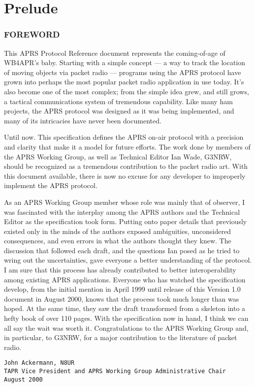 
\part{Prelude}

\section*{FOREWORD}

This APRS Protocol Reference document represents the coming-of-age of WB4APR’s baby.
Starting with a simple concept — a way to track the location of moving objects via packet radio
— programs using the APRS protocol have grown into perhaps the most popular packet radio
application in use today. It’s also become one of the most complex; from the simple idea grew,
and still grows, a tactical communications system of tremendous capability. Like many ham
projects, the APRS protocol was designed as it was being implemented, and many of its
intricacies have never been documented.

Until now. This specification defines the APRS on-air protocol with a precision and clarity that
make it a model for future efforts. The work done by members of the APRS Working Group, as
well as Technical Editor Ian Wade, G3NRW, should be recognized as a tremendous contribution
to the packet radio art. With this document available, there is now no excuse for any developer to
improperly implement the APRS protocol.

As an APRS Working Group member whose role was mainly that of observer, I was fascinated
with the interplay among the APRS authors and the Technical Editor as the specification took
form. Putting onto paper details that previously existed only in the minds of the authors exposed
ambiguities, unconsidered consequences, and even errors in what the authors thought they knew.
The discussion that followed each draft, and the questions Ian posed as he tried to wring out the
uncertainties, gave everyone a better understanding of the protocol. I am sure that this process has
already contributed to better interoperability among existing APRS applications.
Everyone who has watched the specification develop, from the initial mention in April 1999 until
release of this Version 1.0 document in August 2000, knows that the process took much longer
than was hoped. At the same time, they saw the draft transformed from a skeleton into a hefty
book of over 110 pages. With the specification now in hand, I think we can all say the wait was
worth it. Congratulations to the APRS Working Group and, in particular, to G3NRW, for a major
contribution to the literature of packet radio.

\begin{verbatim}
John Ackermann, N8UR
TAPR Vice President and APRS Working Group Administrative Chair
August 2000
\end{verbatim}


